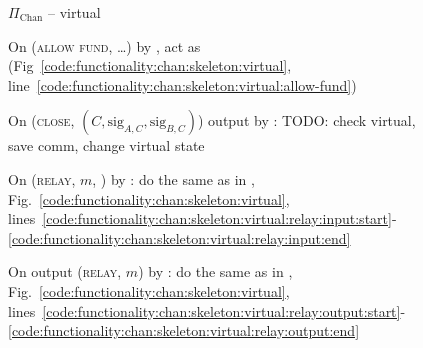 \begin{figure}[H]
\begin{protocolbox}{$\Pi_{\mathrm{Chan}}$ -- virtual}
\begin{algorithmic}[1]
      \State {}
      \State On (\textsc{allow fund}, \dots) by \charlie, act as \fchan
      (Fig~\ref{code:functionality:chan:skeleton:virtual},
      line~\ref{code:functionality:chan:skeleton:virtual:allow-fund})
      \Statex

      \State On (\textsc{close}, $(C, \mathrm{sig}_{A, C}, \mathrm{sig}_{B,
      C})$) output by \charlie:
      \Indent
        \State TODO: check virtual, save comm, change virtual state
      \EndIndent
      \Statex

      \State On (\textsc{relay}, $m$, \charlie) by \environment:
      \Indent
        \State do the same as in \fchan,
        Fig.~\ref{code:functionality:chan:skeleton:virtual},
        lines~\ref{code:functionality:chan:skeleton:virtual:relay:input:start}-\ref{code:functionality:chan:skeleton:virtual:relay:input:end}
      \EndIndent
      \Statex

      \State On output (\textsc{relay}, $m$) by \charlie:
      \Indent
        \State do the same as in \fchan,
        Fig.~\ref{code:functionality:chan:skeleton:virtual},
        lines~\ref{code:functionality:chan:skeleton:virtual:relay:output:start}-\ref{code:functionality:chan:skeleton:virtual:relay:output:end}
      \EndIndent
    \end{algorithmic}
  \end{protocolbox}
  \caption{}
  \label{code:protocol:chan:skeleton:virtual}
\end{figure}
